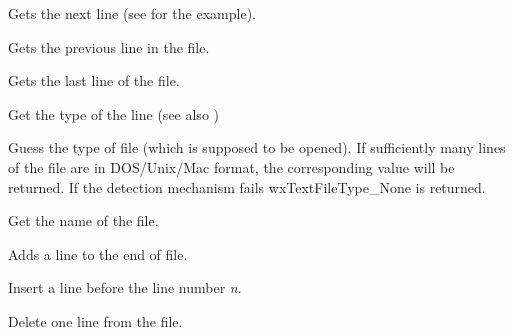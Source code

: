\label{wxtextfilegetnextline}

Gets the next line (see  for 
the example).

\label{wxtextfilegetprevline}

Gets the previous line in the file.

\label{wxtextfilegetlastline}

Gets the last line of the file.

\label{wxtextfilegetlinetype}

Get the type of the line (see also )

\label{wxtextfileguesstype}

Guess the type of file (which is supposed to be opened). If sufficiently
many lines of the file are in DOS/Unix/Mac format, the corresponding value will
be returned. If the detection mechanism fails wxTextFileType\_None is returned.

\label{wxtextfilegetname}

Get the name of the file.

\label{wxtextfileaddline}

Adds a line to the end of file.

\label{wxtextfileinsertline}

Insert a line before the line number {\it n}.

\label{wxtextfileremoveline}

Delete one line from the file.

\label{wxtextfilewrite}

